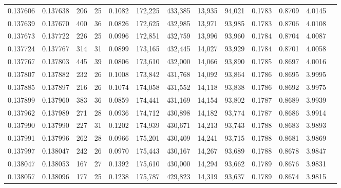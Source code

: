 \begin{tabular}{rrrrrrrrrrrrr}
0.137606 & 0.137638 &   206 &  25 &                                     0.1082 & 172,225 & 433,385 &  13,935 &  94,021 & 0.1783 & 0.8709 & 4.0145 \\
0.137639 & 0.137670 &   400 &  36 &                                     0.0826 & 172,625 & 432,985 &  13,971 &  93,985 & 0.1783 & 0.8706 & 4.0108 \\
0.137673 & 0.137722 &   226 &  25 &                                     0.0996 & 172,851 & 432,759 &  13,996 &  93,960 & 0.1784 & 0.8704 & 4.0087 \\
0.137724 & 0.137767 &   314 &  31 &                                     0.0899 & 173,165 & 432,445 &  14,027 &  93,929 & 0.1784 & 0.8701 & 4.0058 \\
0.137767 & 0.137803 &   445 &  39 &                                     0.0806 & 173,610 & 432,000 &  14,066 &  93,890 & 0.1785 & 0.8697 & 4.0016 \\
0.137807 & 0.137882 &   232 &  26 &                                     0.1008 & 173,842 & 431,768 &  14,092 &  93,864 & 0.1786 & 0.8695 & 3.9995 \\
0.137885 & 0.137897 &   216 &  26 &                                     0.1074 & 174,058 & 431,552 &  14,118 &  93,838 & 0.1786 & 0.8692 & 3.9975 \\
0.137899 & 0.137960 &   383 &  36 &                                     0.0859 & 174,441 & 431,169 &  14,154 &  93,802 & 0.1787 & 0.8689 & 3.9939 \\
0.137962 & 0.137989 &   271 &  28 &                                     0.0936 & 174,712 & 430,898 &  14,182 &  93,774 & 0.1787 & 0.8686 & 3.9914 \\
0.137990 & 0.137990 &   227 &  31 &                                     0.1202 & 174,939 & 430,671 &  14,213 &  93,743 & 0.1788 & 0.8683 & 3.9893 \\
0.137991 & 0.137996 &   262 &  28 &                                     0.0966 & 175,201 & 430,409 &  14,241 &  93,715 & 0.1788 & 0.8681 & 3.9869 \\
0.137997 & 0.138047 &   242 &  26 &                                     0.0970 & 175,443 & 430,167 &  14,267 &  93,689 & 0.1788 & 0.8678 & 3.9847 \\
0.138047 & 0.138053 &   167 &  27 &                                     0.1392 & 175,610 & 430,000 &  14,294 &  93,662 & 0.1789 & 0.8676 & 3.9831 \\
0.138057 & 0.138096 &   177 &  25 &                                     0.1238 & 175,787 & 429,823 &  14,319 &  93,637 & 0.1789 & 0.8674 & 3.9815 \\

\end{tabular}
